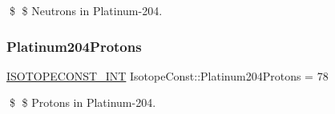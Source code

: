 \$ \$ Neutrons in Platinum-\/204. \mbox{\label{group___isotope_const-_platinum-_pt204_gaaae90989f4a4781618b6be0875527447}} 
\subsubsection{\texorpdfstring{Platinum204\+Protons}{Platinum204Protons}}
{\footnotesize\ttfamily \mbox{\hyperlink{group___isotope_const-_macros_ga5f18360b3e99483a35c32d789e62621c}{I\+S\+O\+T\+O\+P\+E\+C\+O\+N\+S\+T\+\_\+\+I\+NT}} Isotope\+Const\+::\+Platinum204\+Protons = 78}

\$ \$ Protons in Platinum-\/204. 